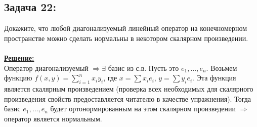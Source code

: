 \documentclass[a4paper,12pt,titlepage,final]{article}
\begin{document}
\subsection*{Задача 22:}
\noindent Докажите, что любой диагонализуемый линейный оператор на конечномерном пространстве можно сделать нормальны в некотором скалярном произведении.\\ \\
\textbf{\underline{Решение:}} \\
Оператор диагонализуемый $\Rightarrow \exists$ базис из с.в. Пусть это $e_1, \ldots, e_n$.
Возьмем функцию $f(x, y) = \sum_{i=1}^n x_iy_i$, где $x = \sum x_i e_i$, $y = \sum y_i e_i$. Эта функция является скалярным произведением
(проверка всех необходимых для скалярного произведения свойств предоставляется читателю в качестве упражнения).
Тогда базис $e_1, \ldots, e_n$ будет ортонормированным на этом скалярном произведении $\Rightarrow$ оператор является нормальным. \blacksquare \\ \\ \\


\end{document}
